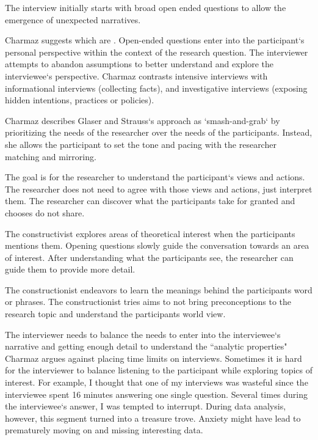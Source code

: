 The interview initially starts with broad open ended questions to allow the emergence of unexpected narratives. 

Charmaz suggests  which are  \cite{Charmaz}. Open-ended questions enter into the participant`s personal perspective within the context of the research question. The interviewer attempts to abandon assumptions to better understand and explore the interviewee`s perspective. Charmaz \cite{Charmaz} contrasts intensive interviews with informational interviews (collecting facts), and investigative interviews (exposing hidden intentions, practices or policies).

Charmaz describes Glaser and Strauss`s approach as \cite{GlaserDiscovery} `smash-and-grab` by prioritizing the needs of the researcher over the needs of the participants. Instead, she allows the participant to set the tone and pacing with the researcher matching and mirroring. 

The goal is for the researcher to understand the participant`s views and actions. The researcher does not need to agree with those views and actions, just interpret them. The researcher can discover what the participants take for granted and chooses do not share. 

The constructivist explores areas of theoretical interest when the participants mentions them. Opening questions slowly guide the conversation towards an area of interest. After understanding what the participants see, the researcher can guide them to provide more detail.

The constructionist endeavors to learn the meanings behind the participants word or phrases. The constructionist tries aims to not bring preconceptions to the research topic and understand the participants world view. 

The interviewer needs to balance the needs to enter into the interviewee`s narrative and getting enough detail to understand the ``analytic properties" Charmaz argues against placing time limits on interviews. Sometimes it is hard for the interviewer to balance listening to the participant while exploring topics of interest. For example, I thought that one of my interviews was wasteful since the interviewee spent 16 minutes answering one single question. Several times during the interviewee`s answer, I was tempted to interrupt. During data analysis, however, this segment turned into a treasure trove. Anxiety might have lead to prematurely moving on and missing interesting data. 

